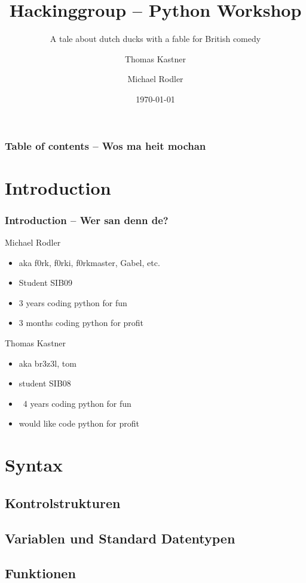 \documentclass{beamer}
\title[Python Workshop]{Hackinggroup -- Python Workshop}
\subtitle{A tale about dutch ducks with a fable for British comedy}
\author[Thomas Kastner, Michael Rodler]{Thomas Kastner\and Michael Rodler}
\date{\today}
\begin{document}
\begin{frame}
\titlepage
\end{frame}

\begin{frame}
\frametitle{Table of contents -- Wos ma heit mochan}
\tableofcontents
\end{frame}

\section{Introduction}

\begin{frame}
\frametitle{Introduction -- Wer san denn de?}

\begin{block}{Michael Rodler}
\begin{itemize}
    \item aka f0rk, f0rki, f0rkmaster, Gabel, etc.
    \item Student SIB09
    \item 3 years coding python for fun
    \item 3 months coding python for profit
\end{itemize}
\end{block}

\begin{block}{Thomas Kastner}
\begin{itemize}
    \item aka br3z3l, tom
    \item student SIB08
    \item ~4 years coding python for fun
    \item would like code python for profit
\end{itemize}
\end{block}

\end{frame}


\section{Syntax}
\subsection{Kontrolstrukturen}
\subsection{Variablen und Standard Datentypen}
\subsection{Funktionen}
\end{document}
